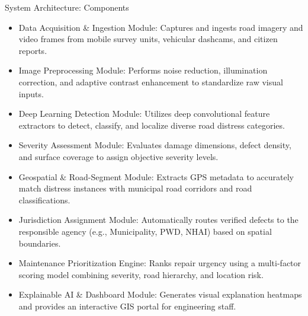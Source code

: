 \documentclass[10pt]{beamer}
\def\textbf#1{#1}%
\def\begin#1{}%
\def\end#1{}%
\begin{document}
\begin{frame}{System Architecture: Components}
    \begin{itemize}
        \setlength{\itemsep}{0.4em}
        \item \textbf{Data Acquisition \& Ingestion Module:} Captures and ingests road imagery and video frames from mobile survey units, vehicular dashcams, and citizen reports.
        \item \textbf{Image Preprocessing Module:} Performs noise reduction, illumination correction, and adaptive contrast enhancement to standardize raw visual inputs.
        \item \textbf{Deep Learning Detection Module:} Utilizes deep convolutional feature extractors to detect, classify, and localize diverse road distress categories.
        \item \textbf{Severity Assessment Module:} Evaluates damage dimensions, defect density, and surface coverage to assign objective severity levels.
        \item \textbf{Geospatial \& Road-Segment Module:} Extracts GPS metadata to accurately match distress instances with municipal road corridors and road classifications.
        \item \textbf{Jurisdiction Assignment Module:} Automatically routes verified defects to the responsible agency (e.g., Municipality, PWD, NHAI) based on spatial boundaries.
        \item \textbf{Maintenance Prioritization Engine:} Ranks repair urgency using a multi-factor scoring model combining severity, road hierarchy, and location risk.
        \item \textbf{Explainable AI \& Dashboard Module:} Generates visual explanation heatmaps and provides an interactive GIS portal for engineering staff.
    \end{itemize}
\end{frame}
\end{document}
